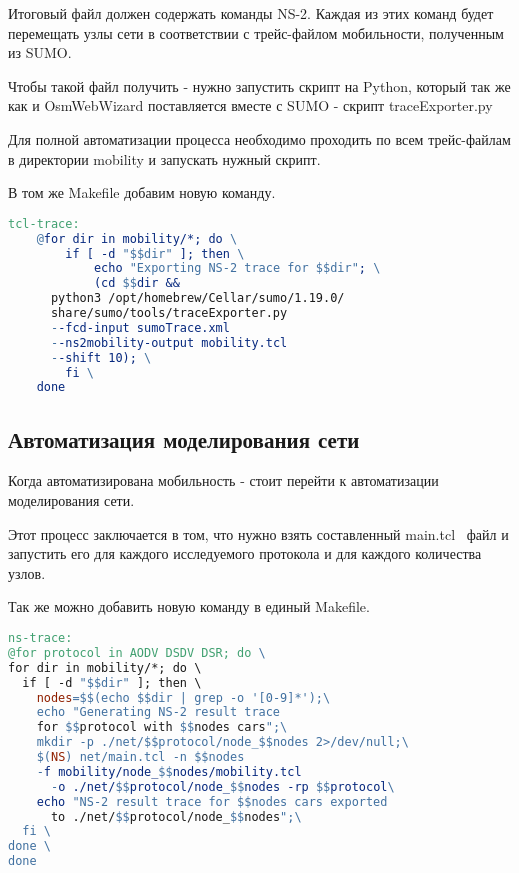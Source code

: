 Итоговый файл должен содержать команды NS-2. Каждая из этих команд будет перемещать узлы сети в соответствии с трейс-файлом мобильности, полученным из SUMO.

Чтобы такой файл получить - нужно запустить скрипт на Python, который так же как и OsmWebWizard поставляется вместе с SUMO - скрипт traceExporter.py

Для полной автоматизации процесса необходимо проходить по всем трейс-файлам в директории mobility и запускать нужный скрипт.

В том же Makefile добавим новую команду.

\begin{lstlisting}[language=make, style=mystyle, caption=Makefile для конвертации трейс-файла]
tcl-trace:
	@for dir in mobility/*; do \
		if [ -d "$$dir" ]; then \
			echo "Exporting NS-2 trace for $$dir"; \
			(cd $$dir && 
      python3 /opt/homebrew/Cellar/sumo/1.19.0/
      share/sumo/tools/traceExporter.py 
      --fcd-input sumoTrace.xml 
      --ns2mobility-output mobility.tcl 
      --shift 10); \
		fi \
	done
\end{lstlisting}

\subsection*{Автоматизация моделирования сети}

Когда автоматизирована мобильность - стоит перейти к автоматизации моделирования сети.

Этот процесс заключается в том, что нужно взять составленный main.tcl~\cite{ns2_examples} файл и запустить его для каждого исследуемого протокола и для каждого количества узлов.

Так же можно добавить новую команду в единый Makefile.

\begin{lstlisting}[language=make, style=mystyle, caption=Makefile для запуска симуляции сети]
ns-trace:
@for protocol in AODV DSDV DSR; do \
for dir in mobility/*; do \
  if [ -d "$$dir" ]; then \
    nodes=$$(echo $$dir | grep -o '[0-9]*');\
    echo "Generating NS-2 result trace 
    for $$protocol with $$nodes cars";\
    mkdir -p ./net/$$protocol/node_$$nodes 2>/dev/null;\
    $(NS) net/main.tcl -n $$nodes 
    -f mobility/node_$$nodes/mobility.tcl
      -o ./net/$$protocol/node_$$nodes -rp $$protocol\
    echo "NS-2 result trace for $$nodes cars exported
      to ./net/$$protocol/node_$$nodes";\
  fi \
done \
done
\end{lstlisting}

